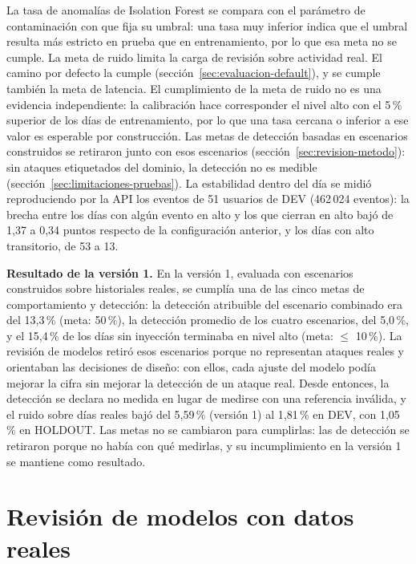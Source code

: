 La tasa de anomalías de Isolation Forest se compara con el parámetro de contaminación con que fija su umbral: una tasa muy inferior indica que el umbral resulta más estricto en prueba que en entrenamiento, por lo que esa meta no se cumple. La meta de ruido limita la carga de revisión sobre actividad real. El camino por defecto la cumple (sección~\ref{sec:evaluacion-default}), y se cumple también la meta de latencia. El cumplimiento de la meta de ruido no es una evidencia independiente: la calibración hace corresponder el nivel alto con el 5\,\% superior de los días de entrenamiento, por lo que una tasa cercana o inferior a ese valor es esperable por construcción. Las metas de detección basadas en escenarios construidos se retiraron junto con esos escenarios (sección~\ref{sec:revision-metodo}): sin ataques etiquetados del dominio, la detección no es medible (sección~\ref{sec:limitaciones-pruebas}). La estabilidad dentro del día se midió reproduciendo por la API los eventos de 51 usuarios de DEV (462\,024 eventos): la brecha entre los días con algún evento en alto y los que cierran en alto bajó de 1,37 a 0,34 puntos respecto de la configuración anterior, y los días con alto transitorio, de 53 a 13.

\textbf{Resultado de la versión 1.} En la versión 1, evaluada con escenarios construidos sobre historiales reales, se cumplía una de las cinco metas de comportamiento y detección: la detección atribuible del escenario combinado era del 13,3\,\% (meta: 50\,\%), la detección promedio de los cuatro escenarios, del 5,0\,\%, y el 15,4\,\% de los días sin inyección terminaba en nivel alto (meta: $\leq$ 10\,\%). La revisión de modelos retiró esos escenarios porque no representan ataques reales y orientaban las decisiones de diseño: con ellos, cada ajuste del modelo podía mejorar la cifra sin mejorar la detección de un ataque real. Desde entonces, la detección se declara no medida en lugar de medirse con una referencia inválida, y el ruido sobre días reales bajó del 5,59\,\% (versión 1) al 1,81\,\% en DEV, con 1,05\,\% en HOLDOUT. Las metas no se cambiaron para cumplirlas: las de detección se retiraron porque no había con qué medirlas, y su incumplimiento en la versión 1 se mantiene como resultado.

\section{Revisión de modelos con datos reales}
\label{sec:revision-modelos}

